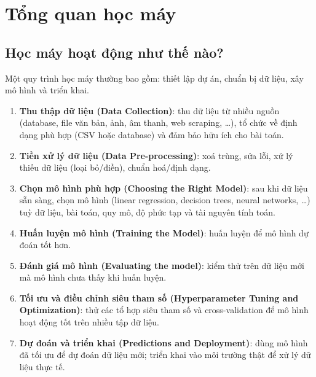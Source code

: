 \section{Tổng quan học máy}

\subsection{Học máy hoạt động như thế nào?}

\begin{dongco}[title={Quy trình tổng quát}]
Một quy trình học máy thường bao gồm: thiết lập dự án, chuẩn bị dữ liệu, xây mô hình và triển khai.
\end{dongco}

\begin{phuongphap}[title={Các giai đoạn (sequential process)}]
\begin{enumerate}
  \item \textbf{Thu thập dữ liệu (Data Collection)}: thu dữ liệu từ nhiều nguồn (database, file văn bản, ảnh, âm thanh, web scraping, \ldots), tổ chức về định dạng phù hợp (CSV hoặc database) và đảm bảo hữu ích cho bài toán.
  \item \textbf{Tiền xử lý dữ liệu (Data Pre-processing)}: xoá trùng, sửa lỗi, xử lý thiếu dữ liệu (loại bỏ/điền), chuẩn hoá/định dạng.
  \item \textbf{Chọn mô hình phù hợp (Choosing the Right Model)}: sau khi dữ liệu sẵn sàng, chọn mô hình (linear regression, decision trees, neural networks, \ldots) tuỳ dữ liệu, bài toán, quy mô, độ phức tạp và tài nguyên tính toán.
  \item \textbf{Huấn luyện mô hình (Training the Model)}: huấn luyện để mô hình dự đoán tốt hơn.
  \item \textbf{Đánh giá mô hình (Evaluating the model)}: kiểm thử trên dữ liệu mới mà mô hình chưa thấy khi huấn luyện.
  \item \textbf{Tối ưu và điều chỉnh siêu tham số (Hyperparameter Tuning and Optimization)}: thử các tổ hợp siêu tham số và cross-validation để mô hình hoạt động tốt trên nhiều tập dữ liệu.
  \item \textbf{Dự đoán và triển khai (Predictions and Deployment)}: dùng mô hình đã tối ưu để dự đoán dữ liệu mới; triển khai vào môi trường thật để xử lý dữ liệu thực tế.
\end{enumerate}
\end{phuongphap}

